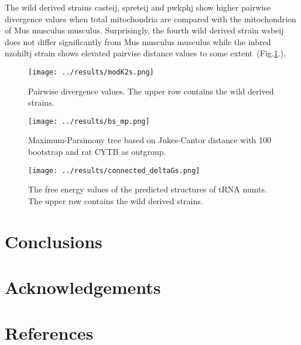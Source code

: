 \documentclass[a4paper,12pt]{article}
\numberwithin{equation}{section} %
\begin{document}
\indent The wild derived strains casteij, spreteij and pwkphj show higher pairwise divergence values when total mitochondria are compared with the mitochondrion of Mus musculus musculus. Surprisingly, the fourth wild derived strain wsbeij does not differ significantly from Mus musculus musculus while the inbred nzohiltj strain shows elevated pairvise distance values to some extent~(Fig.\ref{fig:modK2s}.).
\begin{figure}[H]
    \centering
    \captionsetup{justification=centering}
    \texttt{[image: ../results/modK2s.png]}
    \caption{Pairwise divergence values. The upper row contains the wild derived strains.}
    \label{fig:modK2s}
\end{figure}

\begin{figure}[H]
    \centering
    \captionsetup{justification=centering}
    \texttt{[image: ../results/bs\_mp.png]}
    \caption{Maximum-Parsimony tree based on Jukes-Cantor distance with 100 bootstrap and rat CYTB as outgroup.}
    \label{fig:deltaGs}
\end{figure}

\begin{figure}[H]
    \centering
    \captionsetup{justification=centering}
    \texttt{[image: ../results/connected\_deltaGs.png]}
    \caption{The free energy values of the predicted structures  of tRNA numts. The upper row contains the wild derived strains.}
    \label{fig:deltaGs}
\end{figure}

\section{Conclusions}
\section{Acknowledgements}
\section{References}
\renewcommand{\refname}{}


\end{document}
